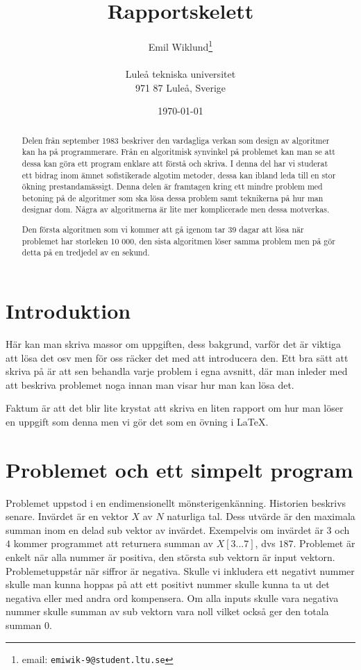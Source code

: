 \documentclass[a4paper,12pt]{article}
\title{Rapportskelett}
\author{Emil Wiklund\thanks{email: \texttt{emiwik-9@student.ltu.se}}\\  
        ~ \\
        Luleå tekniska universitet \\ 
        971 87 Luleå, Sverige}
\date{\today}
\begin{document}
\linenumbers


\maketitle


\begin{abstract}
  Delen från september 1983 beskriver den vardagliga verkan som design av
  algoritmer kan ha på programmerare. Från en algoritmisk synvinkel på
  problemet kan man se att dessa kan göra ett program enklare att förstå
  och skriva. I denna del har vi studerat ett bidrag inom ämnet sofistikerade
  algotim metoder, dessa kan ibland leda till en stor ökning prestandamässigt. 
  Denna delen är framtagen kring ett mindre problem med betoning på de
  algoritmer som ska lösa dessa problem samt teknikerna på hur man designar
  dom. Några av algoritmerna är lite mer komplicerade men dessa motverkas. 


  Den första algoritmen som vi kommer att gå igenom tar 39 dagar att lösa när
  problemet har storleken 10 000, den sista algoritmen löser samma problem
  men på gör detta på en tredjedel av en sekund. 
\end{abstract}


\section{Introduktion}
\label{sec:introduktion}


Här kan man skriva massor om uppgiften, dess bakgrund, varför det är
viktiga att lösa det osv men för oss räcker det med att introducera
den. Ett bra sätt att skriva på är att sen behandla varje problem i
egna avsnitt, där man inleder med att beskriva problemet noga innan
man visar hur man kan lösa det.


Faktum är att det blir lite krystat att skriva en liten rapport om hur
man löser en uppgift som denna men vi gör det som en övning i \LaTeX. 


\section{Problemet och ett simpelt program}
\label{sec:uppg1}


  Problemet uppstod i en endimensionellt mönsterigenkänning. Historien beskrivs
senare. Invärdet är en vektor $X$ av $N$ naturliga tal. Dess utvärde är den
maximala
summan inom en delad sub vektor av invärdet. Exempelvis om invärdet är $3$ och
$4$
kommer programmet att returnera summan av $X[3...7]$, dvs $187$. Problemet är
enkelt
när alla nummer är positiva, den största sub vektorn är input vektorn.
Problemetuppstår när siffror är negativa. Skulle vi inkludera ett negativt
nummer skulle man kunna hoppas på att ett positivt nummer skulle kunna ta ut det
negativa
  eller med andra ord kompensera. Om alla inputs skulle vara negativa nummer
  skulle summan av sub vektorn vara noll vilket också ger den totala summan 0.
\end{document}
